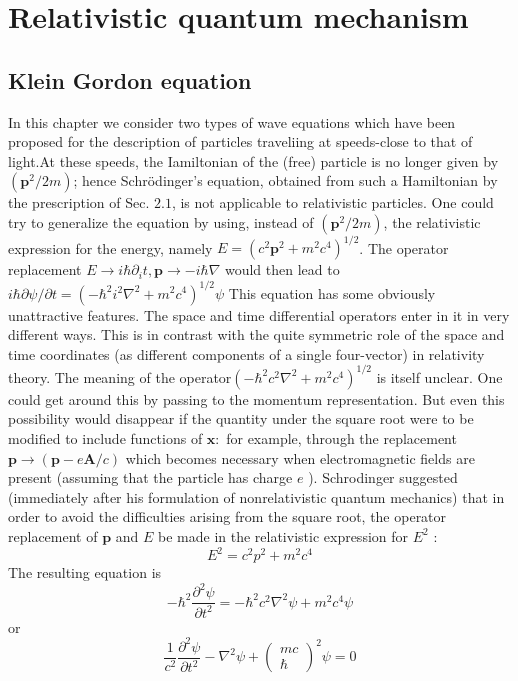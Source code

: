 \chapter{Relativistic quantum mechanism}
\section{Klein Gordon equation}
In this chapter we consider two types of wave equations which have been proposed for the description of particles traveliing at speeds-close to that of light.At these speeds, the Iamiltonian of the (free) particle is no longer given by $\left(\mathbf{p}^{2} / 2 m\right)$; hence Schrödinger's equation, obtained from such a Hamiltonian by the prescription of Sec. $2.1$, is not applicable to relativistic particles. One could try to generalize the equation by using, instead of $\left(\mathbf{p}^{2} / 2 m\right)$, the relativistic expression for the energy, namely $E=\left(c^{2} \mathbf{p}^{2}+m^{2} c^{4}\right)^{1 / 2}$. The operator replacement $E \rightarrow i \hbar \partial_{i} t, \mathbf{p} \rightarrow-i \hbar \nabla$ would then lead to $i \hbar \partial \psi / \partial t=\left(-\hbar^{2} i^{2} \nabla^{2}+m^{2} c^{4}\right)^{1 / 2} \psi$ This equation has some obviously unattractive features. The space and time differential operators enter in it in very different ways. This is in contrast with the quite symmetric role of the space and time coordinates (as different components of a single four-vector) in relativity theory. The meaning of the operator$\left(-\hbar^{2} c^{2} \nabla^{2}+m^{2} c^{4}\right)^{1 / 2}$ is itself unclear. One could get around this by passing to the momentum representation. But even this possibility would disappear if the quantity under the square root were to be modified to include functions of $\mathbf{x}:$ for example, through the replacement $\mathbf{p} \rightarrow(\mathbf{p}-e \mathbf{A} / c)$ which becomes necessary when electromagnetic fields are present (assuming that the particle has charge $e$ ). Schrodinger suggested (immediately after his formulation of nonrelativistic quantum mechanics) that in order to avoid the difficulties arising from the square root, the operator replacement of $\mathbf{p}$ and $E$ be made in the relativistic expression for $E^{2}$ :
$$
E^{2}=c^{2} p^{2}+m^{2} c^{4}
$$
The resulting equation is
$$
-\hbar^{2} \frac{\partial^{2} \psi}{\partial t^{2}}=-\hbar^{2} c^{2} \nabla^{2} \psi+m^{2} c^{4} \psi
$$
or
$$
\frac{1}{c^{2}} \frac{\partial^{2} \psi}{\partial t^{2}}-\nabla^{2} \psi+\left(\begin{array}{c}
m c \\
\hbar
\end{array}\right)^{2} \psi=0
$$
